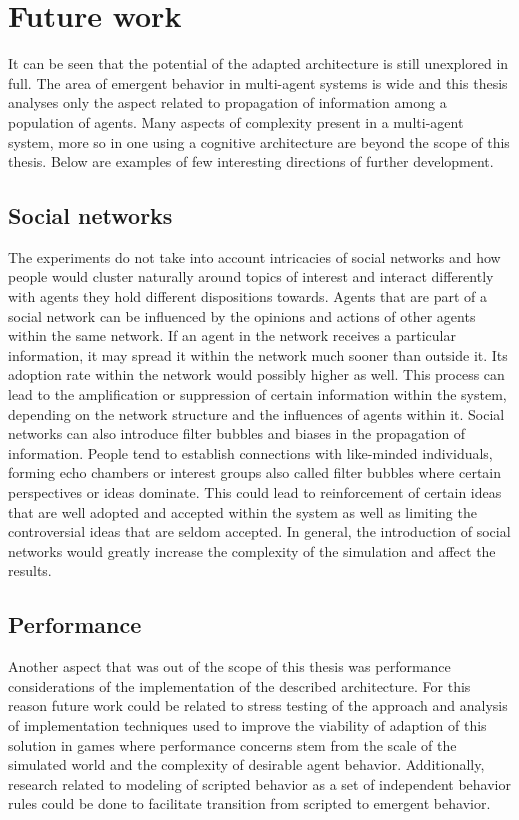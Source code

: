 \section{Future work}

It can be seen that the potential of the adapted architecture is still unexplored in full.
The area of emergent behavior in multi-agent systems is wide and this thesis analyses only the aspect related to propagation of information among a population of agents.
Many aspects of complexity present in a multi-agent system, more so in one using a cognitive architecture are beyond the scope of this thesis.
Below are examples of few interesting directions of further development.

\subsection{Social networks}

The experiments do not take into account intricacies of social networks and how people would cluster naturally around topics of interest and interact differently with agents they hold different dispositions towards.
Agents that are part of a social network can be influenced by the opinions and actions of other agents within the same network.
If an agent in the network receives a particular information, it may spread it within the network much sooner than outside it.
Its adoption rate within the network would possibly higher as well.
This process can lead to the amplification or suppression of certain information within the system, depending on the network structure and the influences of agents within it.
Social networks can also introduce filter bubbles and biases in the propagation of information.
People tend to establish connections with like-minded individuals, forming echo chambers or interest groups also called filter bubbles where certain perspectives or ideas dominate.
This could lead to reinforcement of certain ideas that are well adopted and accepted within the system as well as limiting the controversial ideas that are seldom accepted.
In general, the introduction of social networks would greatly increase the complexity of the simulation and affect the results.

\subsection{Performance}

Another aspect that was out of the scope of this thesis was performance considerations of the implementation of the described architecture.
For this reason future work could be related to stress testing of the approach and analysis of implementation techniques used to improve the viability of adaption of this solution in games where performance concerns stem from the scale of the simulated world and the complexity of desirable agent behavior.
Additionally, research related to modeling of scripted behavior as a set of independent behavior rules could be done to facilitate transition from scripted to emergent behavior.

